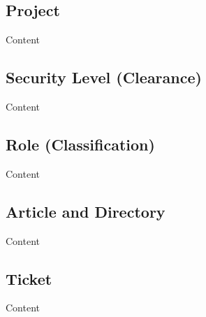 \subsection{Project}

Content


\subsection{Security Level (Clearance)}

Content


\subsection{Role (Classification)}

Content


\subsection{Article and Directory}

Content


\subsection{Ticket}

Content
